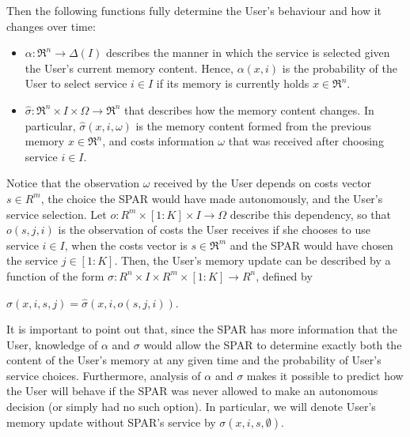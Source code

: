 \documentclass{msdm2012}
\begin{document}
Then the following functions fully determine the User's behaviour and
how it changes over time:
\begin{itemize}
\item $\alpha:\Re^n\rightarrow\Delta(I)$ describes the manner in which the service is
  selected given the User's current memory content. Hence, $\alpha(x,i)$ is the probability of the User to select
  service $i\in I$ if its memory is currently holds $x\in
  \Re^n$.
\item $\widehat{\sigma}:\Re^n\times I\times \Omega\rightarrow \Re^n$
  that describes how the memory content changes. In particular,
  $\widehat{\sigma}(x,i,\omega)$ is the memory content formed from the
  previous memory $x\in\Re^n$, and costs information $\omega$ that was
  received after choosing service $i\in I$.
\end{itemize}

Notice that the observation $\omega$ received by the User depends on
costs vector $s\in R^m$, the choice the SPAR would
have made autonomously, and the User's service selection. Let
$o:R^m\times[1:K]\times I\rightarrow\Omega$ describe this
dependency, so that $o(s,j,i)$ is the observation of costs the
User receives if she chooses to use service $i\in I$, when the
costs vector is $s\in\Re^m$ and the SPAR would have chosen the service
$j\in[1:K]$. Then, the User's memory update can be described by a function of the form $\sigma:R^n\times I\times R^m\times[1:K]\rightarrow R^n$, defined by \\
\centerline{$
\sigma(x,i,s,j)=\widehat{\sigma}(x,i,o(s,j,i)).
$} 

It is important to point out that, since the SPAR has more
information that the User, knowledge of $\alpha$ and $\sigma$ would
allow the SPAR to determine exactly both the content of the User's
memory at any given time and the probability of User's service
choices. Furthermore, analysis of $\alpha$ and $\sigma$ makes it
possible to predict how the User will behave if the SPAR was never
allowed to make an autonomous decision (or simply had no such
option). In particular, we will denote User's memory update without
SPAR's service by $\sigma(x,i,s,\emptyset)$.
\end{document}
